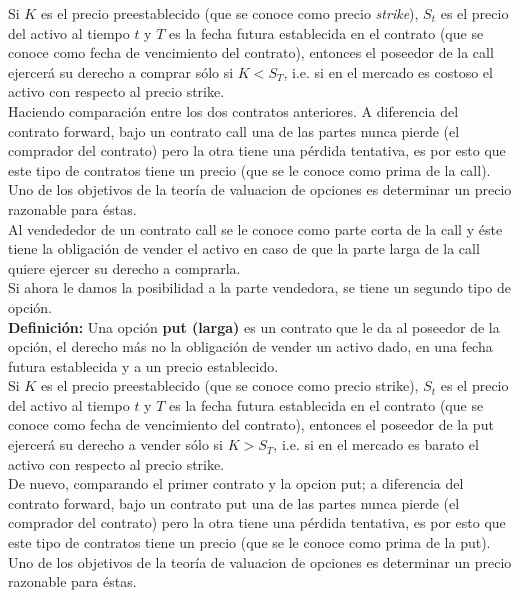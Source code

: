 \documentclass[11pt]{article}
\begin{document}
Si $K$ es el precio preestablecido (que se conoce como precio \textit{strike}),  $S_t$ es el precio del activo al tiempo $t$ y $T$ es la fecha futura establecida 
en el contrato (que se conoce como fecha de  vencimiento del contrato),  entonces el poseedor de la call ejercerá su derecho a comprar sólo si 
$K < S_T$, i.e. si en el mercado es costoso el activo con respecto al precio strike.\\
	
Haciendo comparación entre los dos contratos anteriores. A diferencia del contrato forward, bajo un contrato call una de las partes nunca pierde (el comprador del contrato) pero la otra tiene una pérdida 
tentativa, es por esto que este tipo de contratos tiene un precio (que se le  conoce como prima de la call). Uno de los objetivos de la teoría de valuacion de opciones es determinar un precio razonable para éstas.\\
	
Al vendededor de un contrato call se le conoce como parte corta de la call y éste tiene la obligación de vender el activo en caso de que la parte larga de 
la call quiere ejercer su derecho a comprarla.\\

Si ahora le damos la posibilidad a la parte vendedora, se tiene un segundo tipo de opción.\\
	
\textbf{Definición:} 
Una opción \textbf{put (larga)} es un contrato que le da al poseedor de la opción, el derecho más no la obligación de vender un activo dado, en una fecha futura  establecida y a un precio establecido.\\
	
Si $K$ es el precio preestablecido (que se conoce como precio strike), $S_t$ es el precio del activo al tiempo $t$ y $T$ es la fecha futura establecida en el contrato (que se conoce como fecha de vencimiento del contrato), entonces el poseedor de la put ejercerá su derecho a vender sólo si $K > S_T$, i.e. si en el mercado es barato el activo con respecto al precio strike.\\
	
De nuevo, comparando el primer contrato y la opcion put; a diferencia del contrato forward, bajo un contrato put una de las partes nunca pierde (el comprador del contrato) pero la otra tiene una pérdida tentativa, es por esto que este tipo de contratos tiene un precio (que se le conoce como prima de la put). Uno de los objetivos de la teoría de valuacion de opciones 
es determinar un precio razonable para éstas.\\
	
\end{document}
